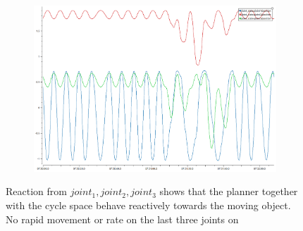 \begin{figure}
\begin{subfigure}[b]{0.4\linewidth}
    \caption{}
  \end{subfigure}
  \begin{subfigure}[b]{0.4\linewidth}
    \includegraphics[width=\linewidth]{reaction_joint123.png}
    \caption{}
  \end{subfigure}

  \caption{Reaction from $joint_1, joint_2, joint_3$ shows that the planner
   together with the cycle space behave reactively towards the moving object. No rapid movement or rate on the last three joints on \rimini}
  \label{fig:reaction_joint}
\end{figure}
